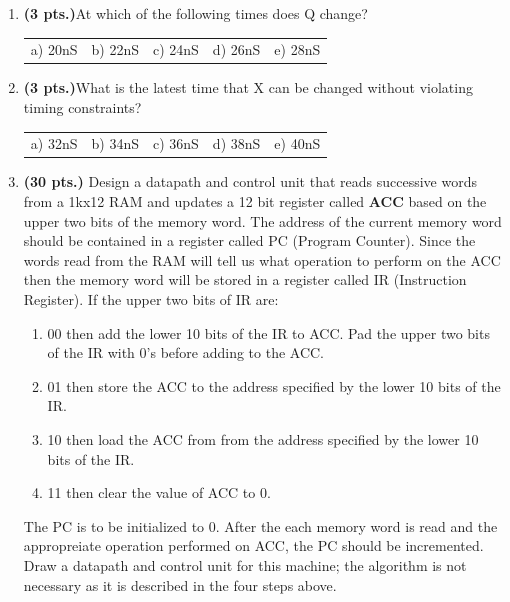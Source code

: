 \documentclass{article}
\begin{document}
\begin{enumerate}
\item {\bf (3 pts.)}At which of the following times does Q change?

\begin{tabular}{p{0.75in}p{0.75in}p{0.75in}p{0.75in}p{0.75in}}
a) 20nS  & b) 22nS  & c) 24nS & d) 26nS & e) 28nS \\
\end{tabular}

\item {\bf (3 pts.)}What is the latest time that X can be changed
without violating timing constraints?

\begin{tabular}{p{0.75in}p{0.75in}p{0.75in}p{0.75in}p{0.75in}}
a) 32nS  & b) 34nS  & c) 36nS & d) 38nS & e) 40nS \\
\end{tabular}

\pagebreak
\item {\bf (30 pts.)}  Design a datapath and control unit that reads successive 
words from a 1kx12 RAM and
updates a 12 bit register called {\bf ACC} based on the upper two bits of the 
memory word.  The address of the current memory word should be contained
in a register called PC (Program Counter).  Since the words read from the
RAM will tell us what operation to perform on the ACC then the memory word will
be stored in a register called IR (Instruction Register).  If the upper
two bits of IR are:
\begin{enumerate}
\item  00 then add the lower 10 bits of the IR to ACC.  Pad the upper two
	bits of the IR with 0's before adding to the ACC.
\item  01 then store the ACC to the address specified by the 
	lower 10 bits of the IR.
\item  10 then load the ACC from from the address specified by the lower 
	10 bits of the IR.
\item  11 then clear the value of ACC to 0.
\end{enumerate}

The PC is to be initialized to 0.  After the each memory word is read
and the appropreiate operation performed on ACC, the PC should be
incremented.  Draw a datapath and control unit for this machine;
the algorithm is not necessary as it is described in the four steps above.

\pagebreak


\end{enumerate}
\end{document}

